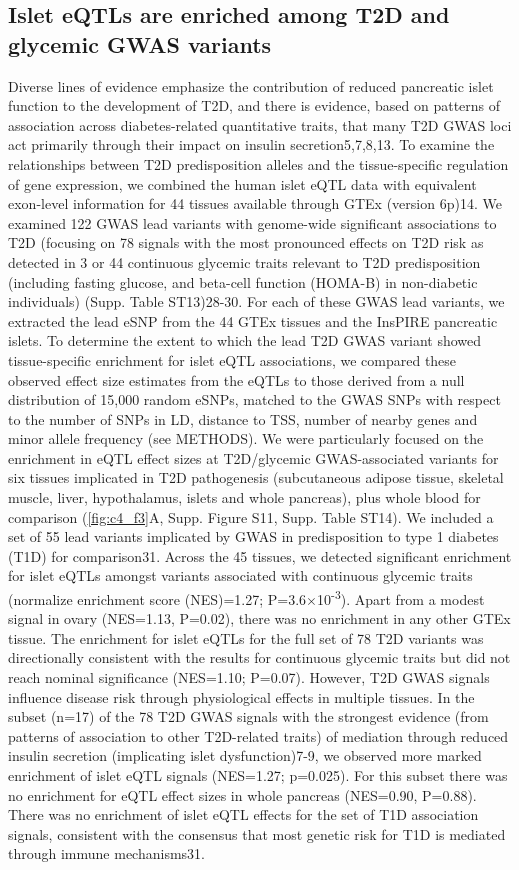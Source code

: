 \subsection{Islet eQTLs are enriched among T2D and glycemic GWAS variants}
Diverse lines of evidence emphasize the contribution of reduced pancreatic islet function to the development of T2D, and there is evidence, based on patterns of association across diabetes-related quantitative traits, that many T2D GWAS loci act primarily through their impact on insulin secretion5,7,8,13. To examine the relationships between T2D predisposition alleles and the tissue-specific regulation of gene expression, we combined the human islet eQTL data with equivalent exon-level information for 44 tissues available through GTEx (version 6p)14.
We examined 122 GWAS lead variants with genome-wide significant associations to T2D (focusing on 78 signals with the most pronounced effects on T2D risk as detected in 3 or 44 continuous glycemic traits relevant to T2D predisposition (including fasting glucose, and beta-cell function (HOMA-B) in non-diabetic individuals) (Supp. Table ST13)28-30. For each of these GWAS lead variants, we extracted the lead eSNP from the 44 GTEx tissues and the InsPIRE pancreatic islets. To determine the extent to which the lead T2D GWAS variant showed tissue-specific enrichment for islet eQTL associations, we compared these observed effect size estimates from the eQTLs to those derived from a null distribution of 15,000 random eSNPs, matched to the GWAS SNPs with respect to the number of SNPs in LD, distance to TSS, number of nearby genes and minor allele frequency (see METHODS). We were particularly focused on the enrichment in eQTL effect sizes at T2D/glycemic GWAS-associated variants for six tissues implicated in T2D pathogenesis (subcutaneous adipose tissue, skeletal muscle, liver, hypothalamus, islets and whole pancreas), plus whole blood for comparison (\ref{fig:c4_f3}A, Supp. Figure S11, Supp. Table ST14). We included a set of 55 lead variants implicated by GWAS in predisposition to type 1 diabetes (T1D) for comparison31.
Across the 45 tissues, we detected significant enrichment for islet eQTLs amongst variants associated with continuous glycemic traits (normalize enrichment score (NES)=1.27; P=3.6$\times$10\textsuperscript{-3}). Apart from a modest signal in ovary (NES=1.13, P=0.02), there was no enrichment in any other GTEx tissue. The enrichment for islet eQTLs for the full set of 78 T2D variants was directionally consistent with the results for continuous glycemic traits but did not reach nominal significance (NES=1.10; P=0.07). However, T2D GWAS signals influence disease risk through physiological effects in multiple tissues. In the subset (n=17) of the 78 T2D GWAS signals with the strongest evidence (from patterns of association to other T2D-related traits) of mediation through reduced insulin secretion (implicating islet dysfunction)7-9, we observed more marked enrichment of islet eQTL signals (NES=1.27; p=0.025). For this subset there was no enrichment for eQTL effect sizes in whole pancreas (NES=0.90, P=0.88). There was no enrichment of islet eQTL effects for the set of T1D association signals, consistent with the consensus that most genetic risk for T1D is mediated through immune mechanisms31.
